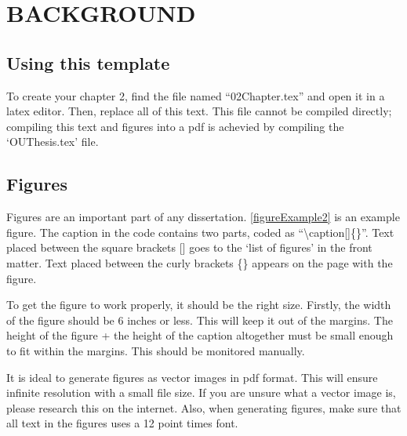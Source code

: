 
\chapter{BACKGROUND}%

\section{Using this template}

To create your chapter 2, find the file named ``02Chapter.tex'' and open it in a latex editor. 
Then, replace all of this text. 
This file cannot be compiled directly; compiling this text and figures into a pdf is achevied by compiling the `OUThesis.tex' file.


\section{Figures}

Figures are an important part of any dissertation. 
\autoref{figureExample2} is an example figure. 
The caption in the code contains two parts, coded as ``\textbackslash caption[]\{\}''. 
Text placed between the square brackets [] goes to the `list of figures' in the front matter. 
Text placed between the curly brackets \{\} appears on the page with the figure. 


To get the figure to work properly, it should be the right size. 
Firstly, the width of the figure should be 6 inches or less. 
This will keep it out of the margins. 
The height of the figure + the height of the caption altogether must be small enough to fit within the margins.
This should be monitored manually. 

It is ideal to generate figures as vector images in pdf format. 
This will ensure infinite resolution with a small file size. 
If you are unsure what a vector image is, please research this on the internet. 
Also, when generating figures, make sure that all text in the figures uses a 12 point times font. 

